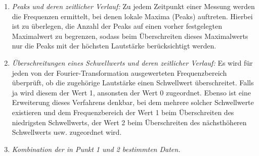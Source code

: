\begin{enumerate}
\item \emph{Peaks und deren zeitlicher Verlauf:} Zu jedem Zeitpunkt einer Messung werden die Frequenzen ermittelt, bei denen lokale Maxima (Peaks) auftreten. Hierbei ist zu überlegen, die Anzahl der Peaks auf einen vorher festgelegten Maximalwert zu begrenzen, sodass beim Überschreiten dieses Maximalwerts nur die Peaks mit der höchsten Lautstärke berücksichtigt werden.
\item \emph{Überschreitungen eines Schwellwerts und deren zeitlicher Verlauf:} Es wird für jeden von der Fourier-Transformation ausgewerteten Frequenzbereich überprüft, ob die zugehörige Lautstärke einen Schwellwert überschreitet. Falls ja wird diesem der Wert 1, ansonsten der Wert 0 zugeordnet. Ebenso ist eine Erweiterung dieses Verfahrens denkbar, bei dem mehrere solcher Schwellwerte existieren und dem Frequenzbereich der Wert 1 beim Überschreiten des niedrigsten Schwellwerts, der Wert 2 beim Überschreiten des nächsthöheren Schwellwerts usw. zugeordnet wird. 
\item\emph{ Kombination der in Punkt 1 und 2 bestimmten Daten.}
\end{enumerate}